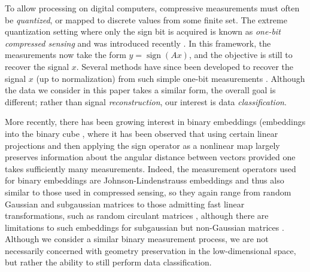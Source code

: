 \documentclass[twoside,11pt]{article}
\DeclareMathOperator*{\sign}{sign}
\newcommand{\edit}[1]{{{#1}}}
\begin{document}
To allow processing on digital computers, compressive measurements must often be \textit{quantized}, or mapped to discrete values from some finite set. The extreme quantization setting where only the sign bit is acquired is known as \textit{one-bit compressed sensing} and was introduced recently \citep{BoufoB_1Bit}. In this framework, the measurements now take the form $y = \sign(Ax)$, and the objective is still to recover the signal $x$. Several methods have since been developed to recover the signal $x$ (up to normalization) from such simple one-bit measurements  \citep{PlanV_One,PlanV_Robust,gopi2013one,JacquLBB_Robust,yan2012robust,jacques2013quantized}. Although the data we consider in this paper takes a similar form, the overall goal is different; rather than signal \textit{reconstruction}, our interest is data \textit{classification}. 


More recently, there has been growing interest in binary embeddings (embeddings into the binary cube \citep{PlanV_Dimension,yu2014circulant,gong2013iterative,price2015binary,choromanska2016binary, dirksen2016fast}, where it has been observed that using certain linear projections and then applying the sign operator as a nonlinear map largely preserves information about the angular distance between vectors provided one takes sufficiently many measurements. Indeed, the measurement operators used for binary embeddings are Johnson-Lindenstrauss embeddings and thus also similar to those used in compressed sensing, so they again range from random Gaussian and subgaussian matrices to those admitting fast linear transformations, such as random circulant matrices  \citep{dirksen2016fast}, \edit{although there are limitations to such embeddings for subgaussian but non-Gaussian matrices \citep{PlanV_Dimension,PlanV_One}}.
Although we consider a similar binary measurement process, we are not necessarily concerned with geometry preservation in the low-dimensional space, but rather the ability to still perform data classification. 
\end{document}
